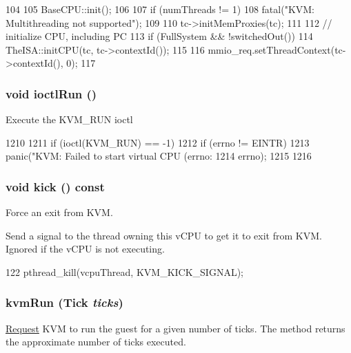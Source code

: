 \begin{DoxyCode}
104 {
105     BaseCPU::init();
106 
107     if (numThreads != 1)
108         fatal("KVM: Multithreading not supported");
109 
110     tc->initMemProxies(tc);
111 
112     // initialize CPU, including PC
113     if (FullSystem && !switchedOut())
114         TheISA::initCPU(tc, tc->contextId());
115 
116     mmio_req.setThreadContext(tc->contextId(), 0);
117 }
\end{DoxyCode}
\hypertarget{classBaseKvmCPU_a745968f1246564028e5b3fd8dde0548d}{
\subsubsection[{ioctlRun}]{\setlength{\rightskip}{0pt plus 5cm}void ioctlRun ()}}
\label{classBaseKvmCPU_a745968f1246564028e5b3fd8dde0548d}
Execute the KVM\_\-RUN ioctl 


\begin{DoxyCode}
1210 {
1211     if (ioctl(KVM_RUN) == -1) {
1212         if (errno != EINTR)
1213             panic("KVM: Failed to start virtual CPU (errno: %
1214                   errno);
1215     }
1216 }
\end{DoxyCode}
\hypertarget{classBaseKvmCPU_ae984a01dc23c52800f5fe28344f59b81}{
\subsubsection[{kick}]{\setlength{\rightskip}{0pt plus 5cm}void kick () const}}
\label{classBaseKvmCPU_ae984a01dc23c52800f5fe28344f59b81}
Force an exit from KVM.

Send a signal to the thread owning this vCPU to get it to exit from KVM. Ignored if the vCPU is not executing. 


\begin{DoxyCode}
122 { pthread_kill(vcpuThread, KVM_KICK_SIGNAL); }
\end{DoxyCode}
\hypertarget{classBaseKvmCPU_aed3dbd0c0bf26d82ee56367a3f350506}{
\subsubsection[{kvmRun}]{ kvmRun ({\bf Tick} {\em ticks})}}
\label{classBaseKvmCPU_aed3dbd0c0bf26d82ee56367a3f350506}
\hyperlink{classRequest}{Request} KVM to run the guest for a given number of ticks. The method returns the approximate number of ticks executed.

